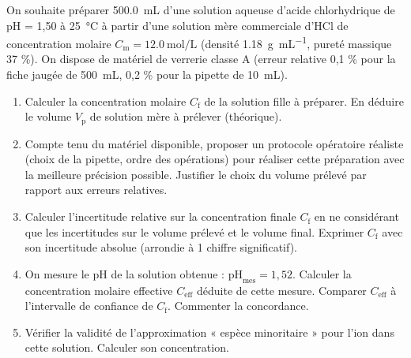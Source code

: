 \documentclass[11pt]{article}
\begin{document}
\begin{exercice}
On souhaite préparer \SI{500,0}{\mL} d'une solution aqueuse d'acide chlorhydrique de pH = 1,50 à \SI{25}{\celsius} à partir d'une solution mère commerciale d'HCl de concentration molaire $C_{\text{m}} = \SI{12,0}{\mol\per\L}$ (densité \SI{1,18}{\g\per\mL}, pureté massique 37 \%). On dispose de matériel de verrerie classe A (erreur relative 0,1 \% pour la fiche jaugée de \SI{500}{\mL}, 0,2 \% pour la pipette de \SI{10}{\mL}).
\begin{enumerate}
    \item Calculer la concentration molaire $C_{\text{f}}$ de la solution fille à préparer. En déduire le volume $V_{\text{p}}$ de solution mère à prélever (théorique).
    \item Compte tenu du matériel disponible, proposer un protocole opératoire réaliste (choix de la pipette, ordre des opérations) pour réaliser cette préparation avec la meilleure précision possible. Justifier le choix du volume prélevé par rapport aux erreurs relatives.
    \item Calculer l'incertitude relative sur la concentration finale $C_{\text{f}}$ en ne considérant que les incertitudes sur le volume prélevé et le volume final. Exprimer $C_{\text{f}}$ avec son incertitude absolue (arrondie à 1 chiffre significatif).
    \item On mesure le pH de la solution obtenue : $\text{pH}_{\text{mes}} = 1,52$. Calculer la concentration molaire effective $C_{\text{eff}}$ déduite de cette mesure. Comparer $C_{\text{eff}}$ à l'intervalle de confiance de $C_{\text{f}}$. Commenter la concordance.
    \item Vérifier la validité de l'approximation « espèce minoritaire » pour l'ion  dans cette solution. Calculer son concentration.
\end{enumerate}
\end{exercice}
\end{document}
